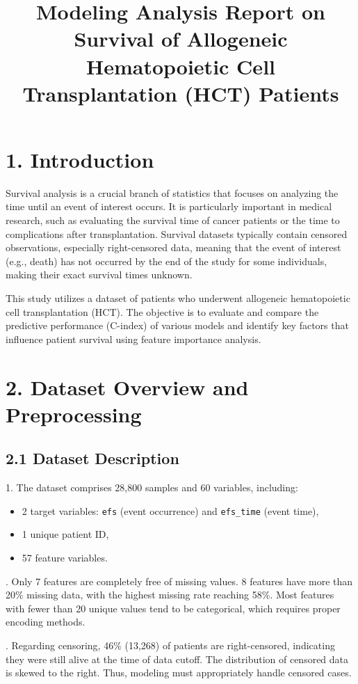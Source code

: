 \documentclass[11pt]{article}
\title{Modeling Analysis Report on Survival of Allogeneic Hematopoietic Cell Transplantation (HCT) Patients}
\author{}
\date{}
\begin{document}
\maketitle

\section*{1. Introduction}
Survival analysis is a crucial branch of statistics that focuses on analyzing the time until an event of interest occurs. It is particularly important in medical research, such as evaluating the survival time of cancer patients or the time to complications after transplantation. Survival datasets typically contain censored observations, especially right-censored data, meaning that the event of interest (e.g., death) has not occurred by the end of the study for some individuals, making their exact survival times unknown.

\noindent This study utilizes a dataset of patients who underwent allogeneic hematopoietic cell transplantation (HCT). The objective is to evaluate and compare the predictive performance (C-index) of various models and identify key factors that influence patient survival using feature importance analysis.

\section*{2. Dataset Overview and Preprocessing}
\subsection*{2.1 Dataset Description}
1. The dataset comprises 28,800 samples and 60 variables, including:
\begin{itemize}
  \item 2 target variables: \texttt{efs} (event occurrence) and \texttt{efs\_time} (event time),
  \item 1 unique patient ID,
  \item 57 feature variables.
\end{itemize}

. Only 7 features are completely free of missing values. 8 features have more than 20\% missing data, with the highest missing rate reaching 58\%. Most features with fewer than 20 unique values tend to be categorical, which requires proper encoding methods.

. Regarding censoring, 46\% (13,268) of patients are right-censored, indicating they were still alive at the time of data cutoff. The distribution of censored data is skewed to the right. Thus, modeling must appropriately handle censored cases.
\end{document}
